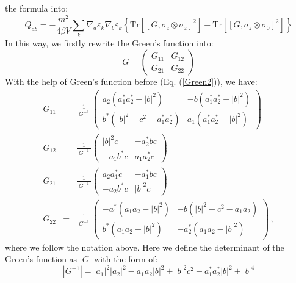 \documentclass{article}
\begin{document}
the formula into:
\begin{equation}
  Q_{a b} = - \frac{m^2}{4 \beta V} \sum_k \nabla_a \varepsilon_k \nabla_b
  \varepsilon_k \left\{ \text{Tr} [[G, \sigma_z \otimes \sigma_z]^2] -
  \text{Tr} [[G, \sigma_z \otimes \sigma_0]^2] \right\} \label{Qab2}
\end{equation}
In this way, we firstly rewrite the Green's function into:
\begin{equation}
  G = \left(\begin{array}{cc}
    G_{11} & G_{12}\\
    G_{21} & G_{22}
  \end{array}\right)
\end{equation}
With the help of Green's function before (Eq. (\ref{Green2})), we have:
\begin{eqnarray}
  G_{11} & = & \frac{1}{| G^{- 1} |} \left(\begin{array}{cc}
    a_2 (a_1^{\ast} a_2^{\ast} - | b |^2) & - b (a_1^{\ast} a_2^{\ast} - | b
    |^2)\\
    b^{\ast} (| b |^2 + c^2 - a_1^{\ast} a_2^{\ast}) & a_1 (a_1^{\ast}
    a_2^{\ast} - | b |^2)
  \end{array}\right) \\
  G_{12} & = & \frac{1}{| G^{- 1} |} \left(\begin{array}{cc}
    | b |^2 c & - a_2^{\ast} b c\\
    - a_1 b^{\ast} c & a_1 a_2^{\ast} c
  \end{array}\right) \\
  G_{21} & = & \frac{1}{| G^{- 1} |} \left(\begin{array}{cc}
    a_2 a_1^{\ast} c & - a_1^{\ast} b c\\
    - a_2 b^{\ast} c & | b |^2 c
  \end{array}\right) \\
  G_{22} & = & \frac{1}{| G^{- 1} |} \left(\begin{array}{cc}
    - a_1^{\ast} (a_1 a_2 - | b |^2) & - b (| b |^2 + c^2 - a_1 a_2)\\
    b^{\ast} (a_1 a_2 - | b |^2) & - a_2^{\ast} (a_1 a_2 - | b |^2)
  \end{array}\right) \,, 
\end{eqnarray}
where we follow the notation above. Here we define the determinant of the
Green's function as $| G |$ with the form of:
\begin{equation}
  | G^{- 1} | = | a_1 |^2 | a_2 |^2 - a_1 a_2 | b |^2 + | b |^2 c^2 -
  a_1^{\ast} a_2^{\ast} | b |^2 + | b |^4 \label{deter}
\end{equation}
\end{document}
